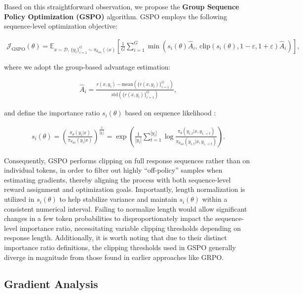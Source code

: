 Based on this straightforward observation, we propose the \textbf{Group Sequence Policy Optimization (GSPO)} algorithm. GSPO employs the following sequence-level optimization objective:

\begin{align}
\mathcal{J}_\text{GSPO} (\theta) =
\mathbb{E}_{ x \sim \mathcal{D},\, \{y_i\}_{i=1}^G \sim \pi_{\theta_\text{old}}( \cdot | x) }
\left[ 
\frac{1}{G} \sum_{i=1}^{G}
\min \left( s_{i}(\theta)  \widehat{A}_{i},  \, \mathrm{clip} \left( s_{i}(\theta), 1 - {\varepsilon}, 1 + {\varepsilon} \right) \widehat{A}_{i} \right) 
\right],
\label{equ:gspo}
\end{align}

where we adopt the group-based advantage estimation:

\begin{align}
\widehat{A}_{i} = \frac{r(x, y_i) - \mathrm{mean} \left( \{ r(x, y_i) \}_{i=1}^G \right) }{ \mathrm{std} \left( \{ r(x, y_i) \}_{i=1}^G \right) },
\end{align}

and define the importance ratio $s_{i}(\theta)$ based on sequence likelihood \citep{click}:

\begin{align}
s_{i}(\theta) = \left( \frac{ \pi_{\theta} (y_i | x) }{ \pi_{\theta_\text{old}} (y_i | x)} \right)^{\frac{1}{|y_i|}}
=
\exp \left( \frac{1}{|y_i|} \sum_{t=1}^{|y_i|} \log \frac{ \pi_{\theta} (y_{i,t} | x, y_{i,<t}) }{ \pi_{\theta_\text{old}} (y_{i,t} | x,y_{i,<t})} \right).
\end{align}

Consequently, GSPO performs clipping on full response sequences rather than on individual tokens, in order to filter out highly ``off-policy'' samples when estimating gradients, thereby aligning the process with both sequence-level reward assignment and optimization goals. Importantly, length normalization is utilized in $s_{i}(\theta)$ to help stabilize variance and maintain $s_{i}(\theta)$ within a consistent numerical interval. Failing to normalize length would allow significant changes in a few token probabilities to disproportionately impact the sequence-level importance ratio, necessitating variable clipping thresholds depending on response length. Additionally, it is worth noting that due to their distinct importance ratio definitions, the clipping thresholds used in GSPO generally diverge in magnitude from those found in earlier approaches like GRPO.

\subsection{Gradient Analysis}
\label{subsec:gradient}

